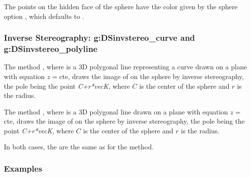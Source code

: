 The points on the hidden face of the sphere have the color given by the sphere option , which defaults to .

\subsubsection{Inverse Stereography: g:DSinvstereo\_curve and g:DSinvstereo\_polyline}

The method , where  is a 3D polygonal line representing a curve drawn on a plane with equation $z=$cte, draws the image of  on the sphere by inverse stereography, the pole being the point \emph{C+r*vecK}, where $C$ is the center of the sphere and $r$ is the radius.

The method , where  is a 3D polygonal line drawn on a plane with equation $z=$cte, draws the image of  on the sphere by inverse stereography, the pole being the point \emph{C+r*vecK}, where $C$ is the center of the sphere and $r$ is the radius.

In both cases, the  are the same as for the  method.

\subsubsection{Examples}

